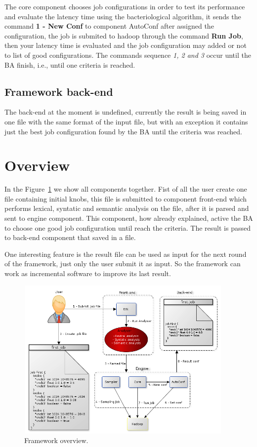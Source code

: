 The core component chooses job configurations in order to test its performance
and evaluate the latency time using the bacteriological algorithm, it sends the
command {\bf 1 - New Conf} to component AutoConf after assigned the configuration,
the job is submited to hadoop through the command {\bf Run Job}, then your latency
time is evaluated and the job configuration may added or not to list of good
configurations. The commands sequence {\it 1, 2 and 3} occur until the BA finish,
i.e., until one criteria is reached.

\subsection{Framework back-end}

The back-end at the moment is undefined, currently the result is being saved in
one file with the same format of the input file, but with an exception it contains
just the best job configuration found by the BA until the criteria was reached.

\section{Overview}

In the Figure~\ref{fig:overview} we show all components together. Fist of all the
user create one file containing initial knobs, this file is submitted to component
front-end which performs lexical, syntatic and semantic analysis on the file, after
it is parsed and sent to engine component. This component, how already explained,
active the BA to choose one good job configuration until reach the criteria. The
result is passed to back-end component that saved in a file.

One interesting feature is the result file can be used as input for the next round
of the framework, just only the user submit it as input. So the framework can work
as incremental software to improve its last result.

\begin{figure}[htbp]
	\centering
	\includegraphics[width=400px,height=300px]{img/overview.png}
	\caption{Framework overview.}\label{fig:overview}
\end{figure}

